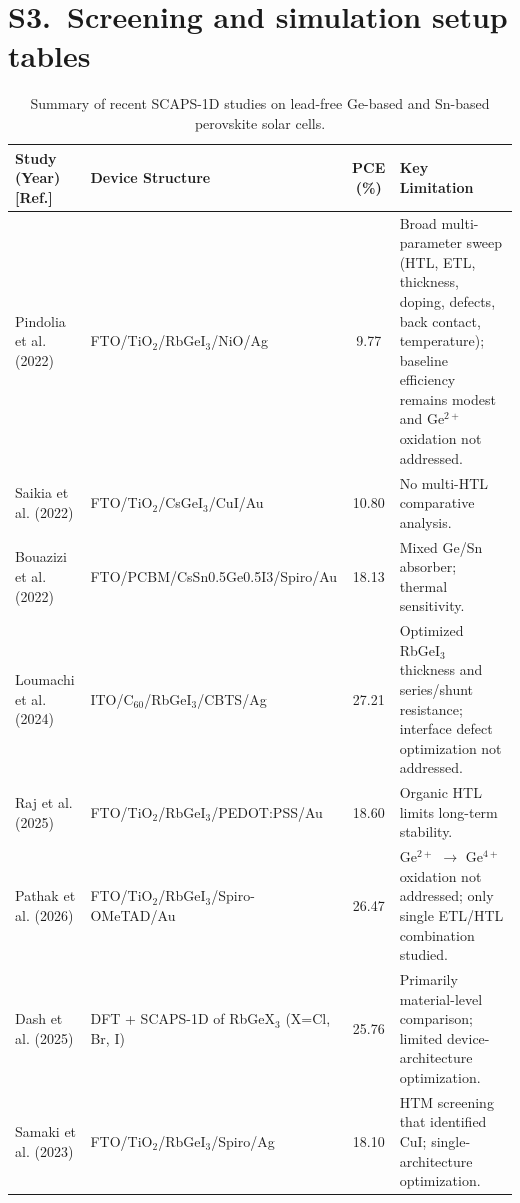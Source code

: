 \documentclass[11pt]{article}
\begin{document}
\section*{S3.\ Screening and simulation setup tables}
\begin{table}[htbp]
\centering
{\small\setlength{\tabcolsep}{3pt}
\begin{tabularx}{\textwidth}{XXcX}
\hline
Study (Year) [Ref.] & Device Structure & PCE (\%) & Key Limitation
\\\hline
Pindolia et al. (2022) \cite{r14} & FTO/\allowbreak{}TiO$_{2}$/RbGeI$_{3}$/NiO/\allowbreak{}Ag & 9.77 & Broad multi-parameter sweep (HTL, ETL, thickness, doping, defects, back contact, temperature); baseline efficiency remains modest and Ge$^{2+}$ oxidation not addressed.\\
Saikia et al. (2022) \cite{r24} & FTO/\allowbreak{}TiO$_{2}$/CsGeI$_{3}$/CuI/\allowbreak{}Au & 10.80 & No multi-HTL comparative analysis.\\
Bouazizi et al. (2022) \cite{r15} & FTO/\allowbreak{}PCBM/\allowbreak{}CsSn0.5Ge0.5I3/\allowbreak{}Spiro/Au & 18.13 & Mixed Ge/Sn absorber; thermal sensitivity.\\
Loumachi et al. (2024) \cite{r22} & ITO/\allowbreak{}C$_{60}$/RbGeI$_{3}$/CBTS/\allowbreak{}Ag & 27.21 & Optimized RbGeI$_{3}$ thickness and series/shunt resistance; interface defect optimization not addressed.\\
Raj et al. (2025) \cite{r39} & FTO/\allowbreak{}TiO$_{2}$/RbGeI$_{3}$/PEDOT:PSS/\allowbreak{}Au & 18.60 & Organic HTL limits long-term stability.\\
Pathak et al. (2026) \cite{r23} & FTO/\allowbreak{}TiO$_{2}$/RbGeI$_{3}$/Spiro-OMeTAD/\allowbreak{}Au & 26.47 & Ge$^{2+}$ $\rightarrow$ Ge$^{4+}$ oxidation not addressed; only single ETL/HTL combination studied.\\
Dash et al. (2025) \cite{r17} & DFT + SCAPS-1D of RbGeX$_{3}$ (X=Cl, Br, I) & 25.76 & Primarily material-level comparison; limited device-architecture optimization.\\
Samaki et al. (2023) \cite{r13} & FTO/\allowbreak{}TiO$_{2}$/RbGeI$_{3}$/Spiro/\allowbreak{}Ag & 18.10 & HTM screening that identified CuI; single-architecture optimization.\\
\hline
\end{tabularx}
}
\caption{Summary of recent SCAPS-1D studies on lead-free Ge-based and Sn-based perovskite solar cells.}
\end{table}
\end{document}
